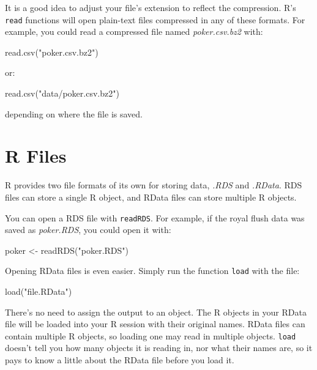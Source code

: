 \documentclass[
  letterpaper,
  DIV=11,
  numbers=noendperiod]{scrbook}
\newenvironment{Shaded}{\begin{snugshade}}{\end{snugshade}}
\newcommand{\FunctionTok}[1]{\textcolor[rgb]{0.28,0.35,0.67}{#1}}
\newcommand{\NormalTok}[1]{\textcolor[rgb]{0.00,0.23,0.31}{#1}}
\newcommand{\OtherTok}[1]{\textcolor[rgb]{0.00,0.23,0.31}{#1}}
\newcommand{\StringTok}[1]{\textcolor[rgb]{0.13,0.47,0.30}{#1}}
\begin{document}
It is a good idea to adjust your file's extension to reflect the
compression. R's \texttt{read} functions will open plain-text files
compressed in any of these formats. For example, you could read a
compressed file named \emph{poker.csv.bz2} with:

\begin{Shaded}
\begin{Highlighting}[]
\FunctionTok{read.csv}\NormalTok{(}\StringTok{"poker.csv.bz2"}\NormalTok{)}
\end{Highlighting}
\end{Shaded}

or:

\begin{Shaded}
\begin{Highlighting}[]
\FunctionTok{read.csv}\NormalTok{(}\StringTok{"data/poker.csv.bz2"}\NormalTok{)}
\end{Highlighting}
\end{Shaded}

depending on where the file is saved.

\section{R Files}\label{r-files}

R provides two file formats of its own for storing data, \emph{.RDS} and
\emph{.RData}. RDS files can store a single R object, and RData files
can store multiple R objects.

You can open a RDS file with \texttt{readRDS}. For example, if the royal
flush data was saved as \emph{poker.RDS}, you could open it with:

\begin{Shaded}
\begin{Highlighting}[]
\NormalTok{poker }\OtherTok{\textless{}{-}} \FunctionTok{readRDS}\NormalTok{(}\StringTok{"poker.RDS"}\NormalTok{)}
\end{Highlighting}
\end{Shaded}

Opening RData files is even easier. Simply run the function
\texttt{load} with the file:

\begin{Shaded}
\begin{Highlighting}[]
\FunctionTok{load}\NormalTok{(}\StringTok{"file.RData"}\NormalTok{)}
\end{Highlighting}
\end{Shaded}

There's no need to assign the output to an object. The R objects in your
RData file will be loaded into your R session with their original names.
RData files can contain multiple R objects, so loading one may read in
multiple objects. \texttt{load} doesn't tell you how many objects it is
reading in, nor what their names are, so it pays to know a little about
the RData file before you load it.
\end{document}

